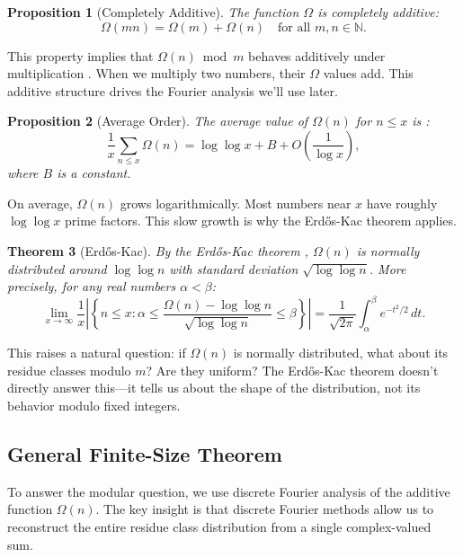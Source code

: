 \documentclass[12pt]{article}
\newtheorem{theorem}{Theorem}[section]
\newtheorem{proposition}[theorem]{Proposition}
\theoremstyle{definition}
\theoremstyle{remark}
\begin{document}
\begin{proposition}[Completely Additive]
The function $\Omega$ is completely additive:
\[
\Omega(mn) = \Omega(m) + \Omega(n) \quad \text{for all } m, n \in \mathbb{N}.
\]
\end{proposition}

This property implies that $\Omega(n) \bmod m$ behaves additively under multiplication \cite{apostol1976introduction}. When we multiply two numbers, their $\Omega$ values add. This additive structure drives the Fourier analysis we'll use later.

\begin{proposition}[Average Order]
The average value of $\Omega(n)$ for $n \leq x$ is \cite{turan1934additive,tenenbaum2015introduction}:
\[
\frac{1}{x} \sum_{n \leq x} \Omega(n) = \log \log x + B + O\left(\frac{1}{\log x}\right),
\]
where $B$ is a constant.
\end{proposition}

On average, $\Omega(n)$ grows logarithmically. Most numbers near $x$ have roughly $\log \log x$ prime factors. This slow growth is why the Erdős-Kac theorem applies.

\begin{theorem}[Erd\H{o}s-Kac]
By the Erd\H{o}s-Kac theorem \cite{erdos1940gaussian}, $\Omega(n)$ is normally distributed around $\log \log n$ with standard deviation $\sqrt{\log \log n}$. More precisely, for any real numbers $\alpha < \beta$:
\[
\lim_{x \to \infty} \frac{1}{x} \left|\left\{n \leq x : \alpha \leq \frac{\Omega(n) - \log \log n}{\sqrt{\log \log n}} \leq \beta\right\}\right| = \frac{1}{\sqrt{2\pi}} \int_{\alpha}^{\beta} e^{-t^2/2} \, dt.
\]
\end{theorem}

This raises a natural question: if $\Omega(n)$ is normally distributed, what about its residue classes modulo $m$? Are they uniform? The Erdős-Kac theorem doesn't directly answer this—it tells us about the shape of the distribution, not its behavior modulo fixed integers.

\subsection{General Finite-Size Theorem}

To answer the modular question, we use discrete Fourier analysis of the additive function $\Omega(n)$. The key insight is that discrete Fourier methods allow us to reconstruct the entire residue class distribution from a single complex-valued sum.
\end{document}
